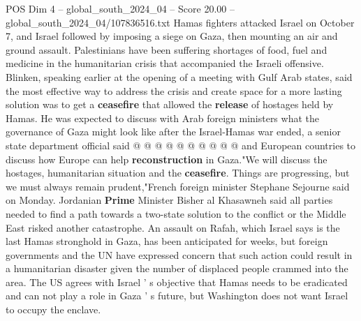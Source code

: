 \begin{textsample}{POS Dim 4 – global\_south\_2024\_04 – Score 20.00 – global\_south\_2024\_04/107836516.txt}
Hamas fighters attacked Israel on October 7, and Israel followed by imposing a siege on Gaza, then mounting an air and ground assault.
Palestinians have been suffering shortages of food, fuel and medicine in the humanitarian crisis that accompanied the Israeli offensive.
Blinken, speaking earlier at the opening of a meeting with Gulf Arab states, said the most effective way to address the crisis and create space for a more lasting solution was to get a \textbf{ceasefire} that allowed the \textbf{release} of hostages held by Hamas.
He was expected to discuss with Arab foreign ministers what the governance of Gaza might look like after the Israel-Hamas war ended, a senior state department official said @ @ @ @ @ @ @ @ @ @ and European countries to discuss how Europe can help \textbf{reconstruction} in Gaza."We will discuss the hostages, humanitarian situation and the \textbf{ceasefire}.
Things are progressing, but we must always remain prudent,"French foreign minister Stephane Sejourne said on Monday.
Jordanian \textbf{Prime} Minister Bisher al Khasawneh said all parties needed to find a path towards a two-state solution to the conflict or the Middle East risked another catastrophe.
An assault on Rafah, which Israel says is the last Hamas stronghold in Gaza, has been anticipated for weeks, but foreign governments and the UN have expressed concern that such action could result in a humanitarian disaster given the number of displaced people crammed into the area.
The US agrees with Israel ' s objective that Hamas needs to be eradicated and can not play a role in Gaza ' s future, but Washington does not want Israel to occupy the enclave.

\end{textsample}
